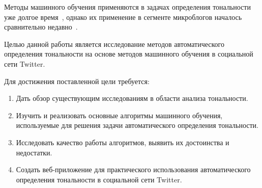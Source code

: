 Методы машинного обучения применяются в задачах определения тональности 
уже долгое время~\cite{Pang2008}, однако их применение в сегменте микроблогов 
началось сравнительно недавно~\cite{Go2009}.

\vspace{0.5cm}

Целью данной работы является исследование методов автоматического 
определения тональности на основе методов машинного обучения в социальной 
сети Twitter. 

Для достижения поставленной цели требуется:

\begin{enumerate}

\item 
Дать обзор существующим исследованиям в области анализа тональности.

\item 
Изучить и реализовать основные алгоритмы машинного обучения, используемые 
для решения задачи автоматического определения тональности.

\item 
Исследовать качество работы алгоритмов, выявить их достоинства и недостатки.

\item 
Создать веб-приложение для практического использования автоматического 
определения тональности в социальной сети Twitter. 

\end{enumerate}